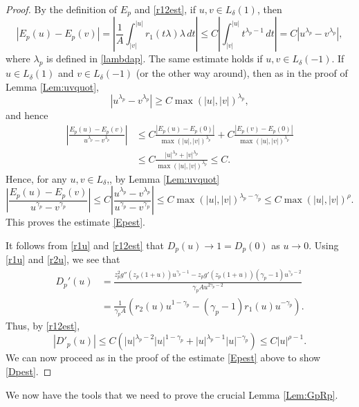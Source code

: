 \documentclass{article}
\numberwithin{equation}{section}
\numberwithin{figure}{section}
\theoremstyle{plain}
\theoremstyle{plain}
\numberwithin{thm}{section}
\theoremstyle{remark}
\let \le \leqslant
\let \ge \geqslant
\begin{document}
\begin{proof}
By the definition of $E_p$ and \eqref{r12est}, if  $u, v \in  L_\delta(1)$, then
\begin{equation*}
|E_p(u)-E_p(v)|=\left|\frac 1A\int_{|v|}^{|u|}r_1(t\lambda)\lambda \,dt\right|\le C\left|\int_{|v|}^{|u|}t^{\lambda_p-1}\,dt\right|=C|u^{\lambda_p}-v^{\lambda_p}|,
\end{equation*}
where $\lambda_p$ is defined in \eqref{lambdap}. The same estimate holds if $u, v \in  L_\delta(-1)$. If $u\in L_\delta(1)$ and $v\in L_\delta(-1)$ (or the other
way around), then as in the proof of Lemma \ref{Lem:uvquot},
\begin{equation*}
|u^{\lambda_p}-v^{\lambda_p}|\ge C\max(|u|,|v|)^{\lambda_p},
\end{equation*}
and hence
\begin{align*}
\left|\frac{E_p(u)-E_p(v)}{u^{\lambda_p}-v^{\lambda_p}}\right|&\le C\frac{|E_p(u)-E_p(0)|}{\max(|u|,|v|)^{\lambda_p}}+C\frac{|E_p(v)-E_p(0)|}{\max(|u|,|v|)^{\lambda_p}}\\
&\le C\frac{|u|^{\lambda_p}+|v|^{\lambda_p}}{\max(|u|,|v|)^{\lambda_p}}\le C.
\end{align*}
Hence, for any  $u, v \in  L_\delta$,, by Lemma \ref{Lem:uvquot}
\begin{equation*}
\left|\frac{E_p(u)-E_p(v)}{u^{\gamma_p}-v^{\gamma_p}}\right|\le C\left|\frac{u^{\lambda_p}-v^{\lambda_p}}{u^{\gamma_p}-v^{\gamma_p}}\right|
\le C\max(|u|,|v|)^{\lambda_p-\gamma_p}\le C\max(|u|,|v|)^{\rho}.
\end{equation*}
This proves the estimate \eqref{Epest}.

It follows from \eqref{r1u} and \eqref{r12est} that $D_p(u)\to 1=D_p(0)$ as $u\to 0$. Using \eqref{r1u} and \eqref{r2u}, we see that
\begin{align*}
D_p'(u)&=\frac{z_p^2g''(z_p(1+u))u^{\gamma_p-1}-z_pg'(z_p(1+u))(\gamma_p-1)u^{\gamma_p-2}}{\gamma_pAu^{2\gamma_p-2}}\\
&=\frac 1{\gamma_pA}(r_2(u)u^{1-\gamma_p}-(\gamma_p-1)r_1(u)u^{-\gamma_p}).
\end{align*}
Thus, by \eqref{r12est},
\begin{equation*}
|D'_p(u)|\le C(|u|^{\lambda_p-2}|u|^{1-\gamma_p}+|u|^{\lambda_p-1}|u|^{-\gamma_p})\le C|u|^{\rho-1}.
\end{equation*}
We can now proceed as in the proof of the estimate \eqref{Epest} above to show \eqref{Dpest}.
\end{proof}

We now have the tools that we need to prove the crucial Lemma \ref{Lem:GpRp}.
\end{document}
